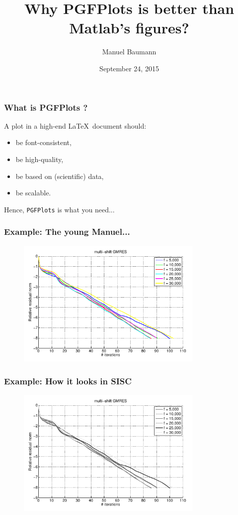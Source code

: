 \documentclass{beamer}
\title{\huge{Why PGFPlots is better than Matlab's figures?}}
\author{Manuel Baumann}
\date{\footnotesize{September 24, 2015}}
\begin{document}
\frame{\titlepage}
\begin{frame}
\frametitle{What is PGFPlots ?}
A plot in a high-end \LaTeX \ document should:
\begin{itemize}
 \item be font-consistent,
 \item be high-quality,
 \item be based on (scientific) data,
 \item be scalable.
\end{itemize}
\pause
Hence, \texttt{PGFPlots} is what you need...
\end{frame}

\begin{frame}
\frametitle{Example: The young Manuel...}
\begin{figure}
 \includegraphics[width=0.8\textwidth]{images/matlab.png}
\end{figure}
\end{frame}

\begin{frame}
\frametitle{Example: How it looks in SISC}
\begin{figure}
 \includegraphics[width=0.8\textwidth]{images/matlab_bw.png}
\end{figure}
\end{frame}
\end{document}
